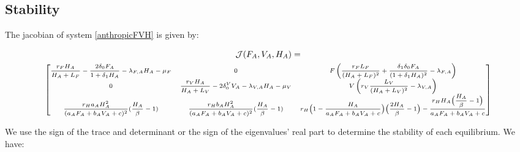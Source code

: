 \documentclass{article}
\newcommand{\lfa}{\lambda_{F, A}}
\newcommand{\lva}{\lambda_{V, A}}
\newcommand{\dv}{\delta_0^V}
\begin{document}
\subsection{Stability}

The jacobian of system \eqref{anthropicFVH} is given by:

\begin{multline}
\mathcal{J}(F_A, V_A, H_A) = \\
{\scriptsize
\begin{bmatrix}
\dfrac{r_F H_A}{H_A+L_F}- \dfrac{2\delta_0F_A}{1 + \delta_1 H_A} - \lfa H_A - \mu_F & 0 & F\left( \dfrac{r_F L_F}{(H_A+L_F)^2} + \dfrac{\delta_1 \delta_0 F_A}{(1+\delta_1 H_A)^2} - \lfa \right)\\
0 & \dfrac{r_V H_A}{H_A+L_V}- 2\dv V_A - \lva H_A - \mu_V &  V\left(r_V \dfrac{L_V}{(H_A+L_V)^2} - \lva \right)\\
\dfrac{r_H a_AH_A^2}{(a_AF_A + b_A V_A +c)^2} (\dfrac{H_A}{\beta}-1) & \dfrac{r_H b_AH_A^2}{(a_AF_A + b_A V_A +c)^2} (\dfrac{H_A}{\beta}-1) & r_H\Big(1-\dfrac{H_A}{a_AF_A + b_AV_A +c}\Big)\Big(\dfrac{2H_A}{\beta}-1\Big) - \dfrac{r_H H_A\Big(\dfrac{H_A}{\beta}-1\Big)}{a_AF_A + b_A V_A + c}
\end{bmatrix}}
\end{multline}

We use the sign of the trace and determinant or the sign of the eigenvalues' real part to determine the stability of each equilibrium. We have:
\end{document}
